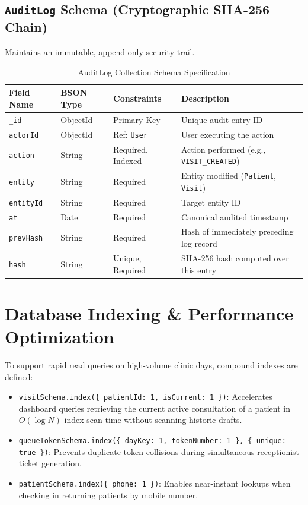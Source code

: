 \documentclass[12pt,a4paper,oneside]{report}
\begin{document}
\subsection{\texttt{AuditLog} Schema (Cryptographic SHA-256 Chain)}
Maintains an immutable, append-only security trail.
\begin{table}[h!]
\centering
\caption{AuditLog Collection Schema Specification}
\small
\begin{tabularx}{\textwidth}{l l l X}
\toprule
\textbf{Field Name} & \textbf{BSON Type} & \textbf{Constraints} & \textbf{Description} \\
\midrule
\texttt{\_id} & ObjectId & Primary Key & Unique audit entry ID \\
\texttt{actorId} & ObjectId & Ref: \texttt{User} & User executing the action \\
\texttt{action} & String & Required, Indexed & Action performed (e.g., \texttt{VISIT\_CREATED}) \\
\texttt{entity} & String & Required & Entity modified (\texttt{Patient}, \texttt{Visit}) \\
\texttt{entityId} & String & Required & Target entity ID \\
\texttt{at} & Date & Required & Canonical audited timestamp \\
\texttt{prevHash} & String & Required & Hash of immediately preceding log record \\
\texttt{hash} & String & Unique, Required & SHA-256 hash computed over this entry \\
\bottomrule
\end{tabularx}
\end{table}

\section{Database Indexing \& Performance Optimization}
To support rapid read queries on high-volume clinic days, compound indexes are defined:
\begin{itemize}
    \item \texttt{visitSchema.index(\{ patientId: 1, isCurrent: 1 \})}: Accelerates dashboard queries retrieving the current active consultation of a patient in $O(\log N)$ index scan time without scanning historic drafts.
    \item \texttt{queueTokenSchema.index(\{ dayKey: 1, tokenNumber: 1 \}, \{ unique: true \})}: Prevents duplicate token collisions during simultaneous receptionist ticket generation.
    \item \texttt{patientSchema.index(\{ phone: 1 \})}: Enables near-instant lookups when checking in returning patients by mobile number.
\end{itemize}
\end{document}

